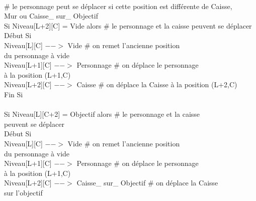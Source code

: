 \documentclass{article}
\begin{document}
\begin{tabbing}
\\	\hspace{4cm}		\# le personnage peut se déplacer si cette position est différente de Caisse,
\\ \hspace{4cm} Mur ou Caisse\_ sur\_ Objectif
\\	\hspace{4cm}		Si Niveau[L+2][C] = Vide alors          \# le personnage et la caisse peuvent se déplacer
\\	\hspace{4cm}		Début Si
\\	\hspace{5cm}			Niveau[L][C] $-->$ Vide 		\# on remet l'ancienne position
\\ \hspace{5cm} du personnage à vide
\\	\hspace{5cm}			Niveau[L+1][C] $-->$ Personnage	\# on déplace le personnage
\\ \hspace{5cm} à la position (L+1,C)
\\	\hspace{5cm}			Niveau[L+2][C] $-->$ Caisse	\# on déplace la Caisse à la position (L+2,C)
\\	\hspace{4cm}		Fin Si
\\
\\	\hspace{4cm}		Si Niveau[L][C+2] = Objectif alors         	\# le personnage et la caisse
\\ \hspace{4cm} peuvent se déplacer
\\	\hspace{4cm}		Début Si
\\	\hspace{5cm}			Niveau[L][C] $-->$ Vide 			\# on remet l'ancienne position
\\ \hspace{5cm} du personnage à vide
\\	\hspace{5cm}			Niveau[L+1][C] $-->$ Personnage		\# on déplace le personnage
\\ \hspace{5cm} à la position (L+1,C)
\\	\hspace{5cm}			Niveau[L+2][C] $-->$ Caisse\_ sur\_ Objectif	\# on déplace la Caisse
\\ \hspace{5cm} sur l'objectif

\end{tabbing}
\end{document}
